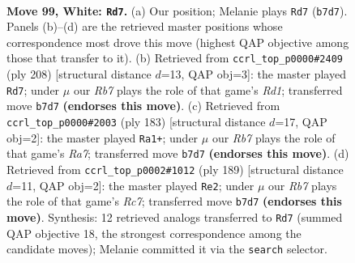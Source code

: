 \documentclass[11pt]{article}
\begin{document}
\clearpage

\begin{figure}[p]\centering
\begin{subfigure}{0.46\textwidth}\centering
\resizebox{\linewidth}{!}{%
\newchessgame
\chessboard[
  setfen={1B4k1/1R6/4r3/7P/4p3/5p2/3K1P2/8 w - - 5 99},
  showmover=false,
  pgfstyle=straightmove, color=movearrow, markmove={b7-d7}
]}
\caption{}
\end{subfigure}\hfill
\begin{subfigure}{0.46\textwidth}\centering
\resizebox{\linewidth}{!}{%
\newchessgame
\chessboard[
  setfen={8/8/5pk1/4p3/7P/1r6/6K1/3RB3 w - - 99 105},
  showmover=false,
  pgfstyle=straightmove, color=movearrow, markmove={d1-d7}
]}
\caption{}
\end{subfigure}
\\[4pt]
\begin{subfigure}{0.46\textwidth}\centering
\resizebox{\linewidth}{!}{%
\newchessgame
\chessboard[
  setfen={8/8/5k2/5p2/5P2/2R1P3/r7/3K4 b - - 62 92},
  showmover=false,
  pgfstyle=straightmove, color=movearrow, markmove={a2-a1}
]}
\caption{}
\end{subfigure}\hfill
\begin{subfigure}{0.46\textwidth}\centering
\resizebox{\linewidth}{!}{%
\newchessgame
\chessboard[
  setfen={8/6k1/3K4/6Pp/5R1P/8/2r5/8 b - - 16 95},
  showmover=false,
  pgfstyle=straightmove, color=movearrow, markmove={c2-e2}
]}
\caption{}
\end{subfigure}
\caption{\textbf{Move 99, White: \texttt{Rd7}.} (a) Our position; Melanie plays \texttt{Rd7} (\texttt{b7d7}). Panels (b)--(d) are the retrieved master positions whose correspondence most drove this move (highest QAP objective among those that transfer to it). (b) Retrieved from \texttt{ccrl\_top\_p0000\#2409} (ply 208) [structural distance $d$=13, QAP obj=3]: the master played \texttt{Rd7}; under $\mu$ our \emph{Rb7} plays the role of that game's \emph{Rd1}; transferred move \texttt{b7d7} \textbf{(endorses this move)}. (c) Retrieved from \texttt{ccrl\_top\_p0000\#2003} (ply 183) [structural distance $d$=17, QAP obj=2]: the master played \texttt{Ra1+}; under $\mu$ our \emph{Rb7} plays the role of that game's \emph{Ra7}; transferred move \texttt{b7d7} \textbf{(endorses this move)}. (d) Retrieved from \texttt{ccrl\_top\_p0002\#1012} (ply 189) [structural distance $d$=11, QAP obj=2]: the master played \texttt{Re2}; under $\mu$ our \emph{Rb7} plays the role of that game's \emph{Rc7}; transferred move \texttt{b7d7} \textbf{(endorses this move)}. Synthesis: 12 retrieved analogs transferred to \texttt{Rd7} (summed QAP objective 18, the strongest correspondence among the candidate moves); Melanie committed it via the \texttt{search} selector.}
\label{fig:thought-m196}
\end{figure}
\end{document}
